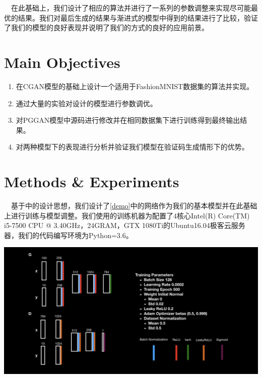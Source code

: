 \documentclass[12pt]{article}
\begin{document}
\ \ 在此基础上，我们设计了相应的算法并进行了一系列的参数调整来实现尽可能最优的结果。我们对最后生成的结果与渐进式的模型中得到的结果进行了比较，验证了我们的模型的良好表现并说明了我们的方式的良好的应用前景。

\section*{Main Objectives}

\begin{enumerate}
\item 在CGAN模型的基础上设计一个适用于FashionMNIST数据集的算法并实现。
\item 通过大量的实验对设计的模型进行参数调优。
\item 对PGGAN模型中源码进行修改并在相同数据集下进行训练得到最终输出结果。
\item 对两种模型下的表现进行分析并验证我们模型在验证码生成情形下的优势。
\end{enumerate}


\section*{Methods \& Experiments}

\ \ 基于\cite{DBLP:journals/corr/MirzaO14}中的设计思想，我们设计了\ref{demo}中的网络作为我们的基本模型并在此基础上进行训练与模型调整。我们使用的训练机器为配置了4核心Intel(R) Core(TM) i5-7500 CPU @ 3.40GHz，24GRAM，GTX 1080Ti的Ubuntu16.04极客云服务器，我们的代码编写环境为Python=3.6。
\begin{center}\vspace{1cm}
\includegraphics[width=1.0\linewidth]{demo.jpeg}
\label{demo}
\end{center}\vspace{1cm}
\end{document}
